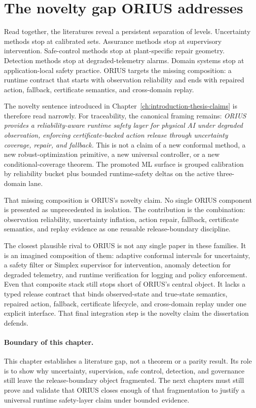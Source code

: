 \section{The novelty gap ORIUS addresses}
Read together, the literatures reveal a persistent separation of levels. Uncertainty methods
stop at calibrated sets. Assurance methods stop at supervisory intervention. Safe-control
methods stop at plant-specific repair geometry. Detection methods stop at degraded-telemetry
alarms. Domain systems stop at application-local safety practice. ORIUS targets the missing
composition: a runtime contract that starts with observation reliability and ends with
repaired action, fallback, certificate semantics, and cross-domain replay.

The novelty sentence introduced in Chapter~\ref{ch:introduction-thesis-claims} is
therefore read narrowly. For traceability, the canonical framing remains:
\emph{ORIUS provides a reliability-aware runtime safety layer for physical AI under degraded observation, enforcing certificate-backed action release through uncertainty coverage, repair, and fallback.}
This is not a claim of a new conformal method, a new robust-optimization primitive, a new
universal controller, or a new conditional-coverage theorem. The promoted ML surface is
grouped calibration by reliability bucket plus bounded runtime-safety deltas on the active
three-domain lane.

That missing composition is ORIUS's novelty claim. No single ORIUS component is presented
as unprecedented in isolation. The contribution is the combination: observation reliability,
uncertainty inflation, action repair, fallback, certificate semantics, and replay evidence
as one reusable release-boundary discipline.

The closest plausible rival to ORIUS is not any single paper in these families. It is an
imagined composition of them: adaptive conformal intervals for uncertainty, a safety filter
or Simplex supervisor for intervention, anomaly detection for degraded telemetry, and
runtime verification for logging and policy enforcement. Even that composite stack still
stops short of ORIUS's central object. It lacks a typed release contract that binds
observed-state and true-state semantics, repaired action, fallback, certificate lifecycle,
and cross-domain replay under one explicit interface. That final integration step is the
novelty claim the dissertation defends.

\paragraph{Boundary of this chapter.}
This chapter establishes a literature gap, not a theorem or a parity result. Its role is to
show why uncertainty, supervision, safe control, detection, and governance still leave the
release-boundary object fragmented. The next chapters must still prove and validate that
ORIUS closes enough of that fragmentation to justify a universal runtime safety-layer claim
under bounded evidence.
